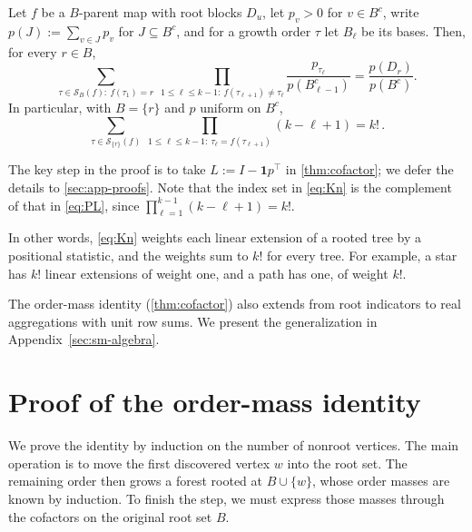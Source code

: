 \documentclass[onefignum,onetabnum,nohypdvips]{siamart250211}
\numberwithin{theorem}{section}
\numberwithin{equation}{section}
\newcommand{\Orders}{\mathcal{S}}
\newcommand{\one}{\mathbf{1}}
\begin{document}
\begin{corollary}\label{cor:PL}
Let $f$ be a $B$-parent map with root blocks $D_u$, let $p_v>0$ for
$v\in B^c$, write $p(J):=\sum_{v\in J}p_v$ for $J\subseteq B^c$, and for a growth order
$\tau$ let $B_\ell$ be its bases. Then, for every $r\in B$,
\begin{equation}\label{eq:PL}
\sum_{\tau\in\Orders_B(f):\ f(\tau_1)=r}\
\prod_{1\le \ell\le k-1:\ f(\tau_{\ell+1})\ne\tau_\ell}\frac{p_{\tau_\ell}}{p(B_{\ell-1}^c)}
=\frac{p(D_r)}{p(B^c)} .
\end{equation}
In particular, with $B=\{r\}$ and $p$ uniform on $B^c$,
\begin{equation}\label{eq:Kn}
\sum_{\tau\in\Orders_{\{r\}}(f)}\
\prod_{1\le \ell\le k-1:\ \tau_\ell=f(\tau_{\ell+1})}(k-\ell+1)=k!\,.
\end{equation}
\end{corollary}

The key step in the proof is to take $L:=I-\one p^{\top}$ in
\cref{thm:cofactor}; we defer the details to \cref{sec:app-proofs}.
Note that the index set in \eqref{eq:Kn}
is the complement of that in \eqref{eq:PL}, since
$\prod_{\ell=1}^{k-1}(k-\ell+1)=k!$.

\begin{remark}\label{rem:linext}
In other words, \eqref{eq:Kn} weights each linear extension of
a rooted tree by a positional statistic, and the weights sum to $k!$
for every tree. For example, a star has
$k!$ linear extensions of weight one, and a path has one, of weight
$k!$. 
\end{remark}

\begin{remark}
The order-mass identity (\cref{thm:cofactor}) also extends from root
indicators to real aggregations with unit row sums. We present the generalization in Appendix~\ref{sec:sm-algebra}.
\end{remark}


\section{Proof of the order-mass identity}\label{sec:proof}

We prove the identity by induction on the number of nonroot vertices.
The main operation is to move the first discovered vertex $w$ into
the root set. The remaining order then grows a forest rooted at
$B\cup\{w\}$, whose order masses are known by induction. To finish the
step, we must express those masses through the cofactors on the
original root set $B$.
\end{document}
